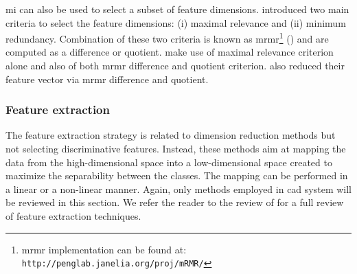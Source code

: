 \ac{mi} can also be used to select a subset of feature dimensions. %
\cite{Peng2005} introduced two main criteria to select the feature dimensions: (i) maximal relevance and (ii) minimum redundancy.
%
%
%
%
%
%
%
Combination of these two criteria is known as \ac{mrmr}\footnote{\ac{mrmr} implementation can be found at: \texttt{http://penglab.janelia.\allowbreak org/proj/mRMR/}} (\cite{Peng2005}) and are computed as a difference or quotient. %
\cite{Niaf2011,Niaf2012} make use of maximal relevance criterion alone and also of both \ac{mrmr} difference and quotient criterion. \cite{Viswanath2012} also reduced their feature vector via \ac{mrmr} difference and quotient.

\subsubsection{Feature extraction}

The feature extraction strategy is related to dimension reduction methods but not selecting discriminative features. Instead, these methods aim at mapping the data from the high-dimensional space into a low-dimensional space created to maximize the separability between the classes. The mapping can be performed in a linear or a non-linear manner. Again, only methods employed in \ac{cad} system will be reviewed in this section. We refer the reader to the review of \cite{Fodor2002} for a full review of feature extraction techniques.

